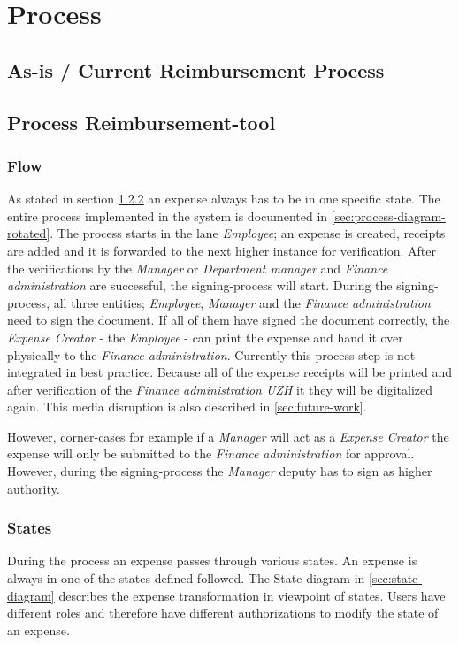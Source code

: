 \chapter{Process}

\section{As-is / Current Reimbursement Process}





\section{Process Reimbursement-tool}

\subsection{Flow}
\label{sec:processflow}
As stated in section \ref{sec:states} an expense always has to be in one specific state. The entire process implemented in the system is documented in \ref{sec:process-diagram-rotated}.\newline
The process starts in the lane \textit{Employee}; an expense is created, receipts are added and it is forwarded to the next higher instance for verification. After the verifications by the \textit{Manager} or \textit{Department manager} and \textit{Finance administration} are successful, the signing-process will start. During the signing-process, all three entities; \textit{Employee}, \textit{Manager} and the \textit{Finance administration} need to sign the document. If all of them have signed the document correctly, the \textit{Expense Creator} - the \textit{Employee} - can print the expense and hand it over physically to the \textit{Finance administration}. Currently this process step is not integrated in best practice. Because all of the expense receipts will be printed and after verification of the \textit{Finance administration UZH} it they will be digitalized again. This media disruption is also described in \ref{sec:future-work}.\par
However, corner-cases for example if a \textit{Manager} will act as a \textit{Expense Creator} the expense will only be submitted to the \textit{Finance administration} for approval. However, during the signing-process the \textit{Manager} deputy has to sign as higher authority.

\subsection{States}
\label{sec:states}
During the process an expense passes through various states. An expense is always in one of the states defined followed. The State-diagram in \ref{sec:state-diagram} describes the expense transformation in viewpoint of states. Users have different roles and therefore have different authorizations to modify the state of an expense.

